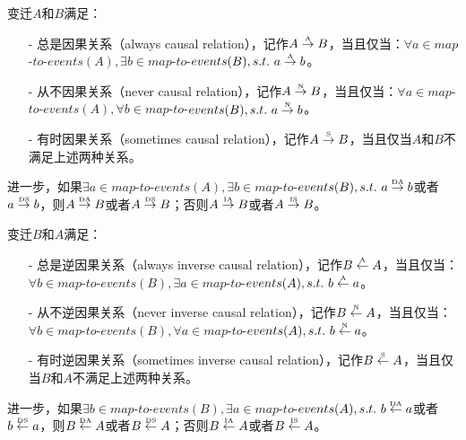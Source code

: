 \begin{definition}[变迁间扩展不确定精炼因果关系]\label{def:exroru_transition_causal}
变迁$A$和$B$满足：
  \begin{itemize}
    \item[-] 总是因果关系（always causal relation），记作$A\overset{\text{\tiny{A}}}{\rightarrow}B$，当且仅当：$\forall a\in map$-$to$-$events(A),\exists b\in map$-$to$-$events(B),s.t.~a\overset{\text{\tiny{A}}}{\rightarrow}b$。
    \item[-] 从不因果关系（never causal relation），记作$A\overset{\text{\tiny{N}}}{\rightarrow}B$，当且仅当：$\forall a\in map$-$to$-$events(A),\forall b\in map$-$to$-$events(B),s.t.~a\overset{\text{\tiny{N}}}{\rightarrow}b$。
    \item[-] 有时因果关系（sometimes causal relation），记作$A\overset{\text{\tiny{S}}}{\rightarrow}B$，当且仅当$A$和$B$不满足上述两种关系。
  \end{itemize}
进一步，如果$\exists a\in map$-$to$-$events(A),\exists b\in map$-$to$-$events(B),s.t.~a\overset{\text{\tiny{DA}}}{\rightarrow}b$或者$a\overset{\text{\tiny{DS}}}{\rightarrow}b$，则$A\overset{\text{\tiny{DA}}}{\rightarrow}B$或者$A\overset{\text{\tiny{DS}}}{\rightarrow}B$；否则$A\overset{\text{\tiny{IA}}}{\rightarrow}B$或者$A\overset{\text{\tiny{IS}}}{\rightarrow}B$。
\end{definition}

\begin{definition}[变迁间扩展不确定精炼逆因果关系]\label{def:exroru_transition_inverse_causal}
变迁$B$和$A$满足：
  \begin{itemize}
    \item[-] 总是逆因果关系（always inverse causal relation），记作$B\overset{\text{\tiny{A}}}{\leftarrow}A$，当且仅当：$\forall b\in map$-$to$-$events(B),\exists a\in map$-$to$-$events(A),s.t.~b\overset{\text{\tiny{A}}}{\leftarrow}a$。
    \item[-] 从不逆因果关系（never inverse causal relation），记作$B\overset{\text{\tiny{N}}}{\leftarrow}A$，当且仅当：$\forall b\in map$-$to$-$events(B),\forall a\in map$-$to$-$events(A),s.t.~b\overset{\text{\tiny{N}}}{\leftarrow}a$。
    \item[-] 有时逆因果关系（sometimes inverse causal relation），记作$B\overset{\text{\tiny{S}}}{\leftarrow}A$，当且仅当$B$和$A$不满足上述两种关系。
  \end{itemize}
进一步，如果$\exists b\in map$-$to$-$events(B),\exists a\in map$-$to$-$events(A),s.t.~b\overset{\text{\tiny{DA}}}{\leftarrow}a$或者$b\overset{\text{\tiny{DS}}}{\leftarrow}a$，则$B\overset{\text{\tiny{DA}}}{\leftarrow}A$或者$B\overset{\text{\tiny{DS}}}{\leftarrow}A$；否则$B\overset{\text{\tiny{IA}}}{\leftarrow}A$或者$B\overset{\text{\tiny{IS}}}{\leftarrow}A$。
\end{definition}

